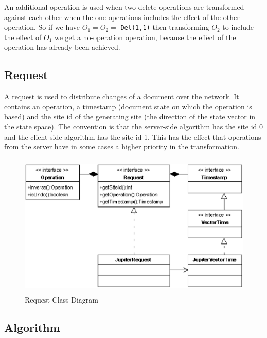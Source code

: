 An additional operation is used when two delete operations are transformed
against each other when the one operations includes the effect of the other
operation. So if we have $O_1 = O_2 = $ \texttt{Del(1,1)} then transforming
$O_2$ to include the effect of $O_1$ we get a no-operation operation, because
the effect of the operation has already been achieved.


\subsection{Request}
A request is used to distribute changes of a document over the network. It 
contains an operation, a timestamp (document 
state on which the operation is based) and the site id of the generating site
(the direction of the state vector in the state space). The convention is
that the server-side algorithm has the site id 0 and the client-side
algorithm has the site id 1. This has the effect that operations
from the server have in some cases a higher priority in the transformation.

\begin{figure}[H]
\centering
\includegraphics[height=6.87cm,width=12.09cm]{../images/finalreport/algorithm_request.eps}
\caption{Request Class Diagram}
\label{Request Class Diagram}
\end{figure}


\subsection{Algorithm}

